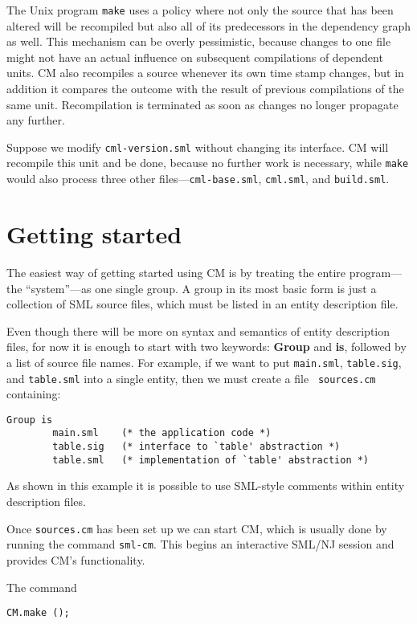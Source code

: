 \documentclass{article}
\begin{document}
The {\sc Unix} program {\tt make} uses a policy where not only the
source that has been altered will be recompiled but also all of its
predecessors in the dependency graph as well.  This mechanism can be
overly pessimistic, because changes to one file might not have an
actual influence on subsequent compilations of dependent units.  CM
also recompiles a source whenever its own time stamp changes, but in
addition it compares the outcome with the result of previous
compilations of the same unit. Recompilation is terminated as soon as
changes no longer propagate any further.

Suppose we modify {\tt cml-version.sml} without changing its
interface.  CM will recompile this unit and be done, because no
further work is necessary, while {\tt make} would also process three
other files---{\tt cml-base.sml}, {\tt cml.sml}, and {\tt build.sml}.

\section{Getting started}

The easiest way of getting started using CM is by treating the entire
program---the ``system''---as one single group.  A group in its most
basic form is just a collection of SML source files, which must be
listed in an entity description file.

Even though there will be more on syntax and semantics of entity
description files, for now it is enough to start with two keywords:
{\bf Group} and {\bf is}, followed by a list of source file names.
For example, if we want to put {\tt main.sml}, {\tt table.sig}, and
{\tt table.sml} into a single entity, then we must create a file {\tt
sources.cm} containing:

\begin{verbatim}
Group is
        main.sml    (* the application code *)
        table.sig   (* interface to `table' abstraction *)
        table.sml   (* implementation of `table' abstraction *)
\end{verbatim}

As shown in this example it is possible to use SML-style comments
within entity description files.

Once {\tt sources.cm} has been set up we can start CM, which is
usually done by running the command {\tt sml-cm}.  This begins an
interactive SML/NJ session and provides CM's functionality.

The command

\begin{verbatim}
CM.make ();
\end{verbatim}
\end{document}
